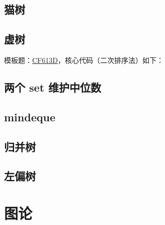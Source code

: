 \documentclass[12pt]{article}
\begin{document}
\newpage

\subsection{猫树}



\newpage

\subsection{虚树}

模板题：\href{https://codeforces.com/problemset/problem/613/D}{CF613D}，核心代码（二次排序法）如下：



\newpage

\subsection{两个 set 维护中位数}



\newpage

\subsection{mindeque}



\newpage

\subsection{归并树}



\newpage

\subsection{左偏树}



\newpage

{\centering\section{图论}}
\end{document}
